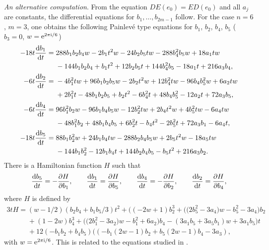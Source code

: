 \documentclass[pdftex]{sigma}
\numberwithin{equation}{section}
\begin{document}
 {\it An alternative computation}. From the equation $DE(e_0)=ED(e_0)$ and all $a_j$ are constants, the differential equations for $b_1,\dots ,b_{2m-1}$ follow. For the case $n=6$, $m=3$, one obtains the
 following Painlev\'e type equations
 for $b_1$, $b_2$, $b_4$, $b_5$ ($b_3=0$, $w={\rm e}^{2\pi {\rm i}/6}$)
\begin{align*}
-18t\frac{{\rm d}b_1}{{\rm d}t} ={}& 288b_1b_2b_4w - 2b_1t^2w - 24b_2b_5tw - 288b_4^2b_5w + 18a_1tw \\
& - 144b_1b_2b_4
+ b_1t^2 + 12b_2b_5t + 144b_4^2b_5 - 18a_1t + 216a_3b_4,\\
- 6t\frac{{\rm d}b_2}{{\rm d}t} ={}& -4b_1^2tw + 96b_1b_2b_5w - 2b_2t^2w + 12b_4^2tw - 96b_4b_5^2w + 6a_2tw \\
& + 2b_1^2t - 48b_1b_2b_5 + b_2t^2 - 6b_4^2t + 48b_4b_5^2 - 12a_2t + 72a_3b_5, \\
 -6t\frac{{\rm d}b_4}{{\rm d}t} ={}& 96b_1^2b_2w - 96b_1b_4b_5w - 12b_2^2tw +
 2b_4t^2w + 4b_5^2tw - 6a_4tw \\ & - 48b_1^2b_2 + 48b_1b_4b_5 + 6b_2^2t
 - b_4t^2 - 2b_5^2t + 72a_3b_1 - 6a_4t,\\
-18t \frac{{\rm d}b_5}{{\rm d}t} ={}& 88b_1b_2^2w + 24b_1b_4tw - 288b_2b_4b_5w + 2b_5t^2w
 - 18a_5tw \\
 & - 144b_1b_2^2 - 12b_1b_4t + 144b_2b_4b_5
 - b_5t^2 + 216a_3b_2.
 \end{align*}
There is a Hamiltonian function $H$ such that
\[ \frac{{\rm d}b_5}{{\rm d}t}=-\frac{\partial H}{\partial b_1},\qquad \frac{{\rm d}b_1}{{\rm d}t}=\frac{\partial H}{\partial b_5},\qquad \frac{{\rm d}b_4}{{\rm d}t}=-\frac{\partial H}{\partial b_2},\qquad
\frac{{\rm d}b_2}{{\rm d}t}=\frac{\partial H}{\partial b_4},\]
where $H$ is defined by
\begin{gather*}
3tH= (w - 1/2)(b_2b_4 + b_1b_5/3)t^2 + \bigl((-2w + 1)b_2^3 + \bigl(\bigl(2b_5^2 - 3a_4\bigr)w - b_5^2 - 3a_4\bigr)b_2 \\
 \phantom{3tH=}{} + (1-2w)b_4^3
 + \bigl(\bigl(2b_1^2 - 3a_2\bigr)w - b_1^2 + 6a_2\bigr)b_4 - (3a_1b_5 + 3a_5b_1)w + 3a_1b_5\bigr)t \\
 \phantom{3tH=}{}+ 12(-b_1b_2 + b_4b_5)((-b_1(2w - 1)b_2 + b_5(2w - 1)b_4 - 3a_3),
 \end{gather*}
 with $w={\rm e}^{2\pi {\rm i} /6}$. This is related to the equations studied in \cite{H-K-N-S}.
\end{document}
